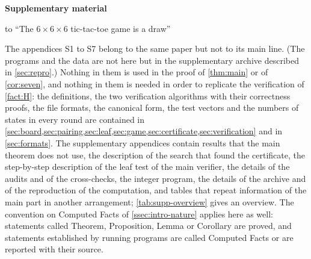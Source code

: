 \clearpage
\makeatletter
\setcounter{section}{0}
\renewcommand{\thesection}{S\arabic{section}}
\setcounter{table}{0}
\renewcommand{\thetable}{S\arabic{table}}
\makeatother
{}\label{part:supp}
\begin{center}
{\Large\bfseries Supplementary material}\par\smallskip
to ``The $6\times6\times6$ tic-tac-toe game is a draw''
\end{center}
\bigskip

\noindent
The appendices S1 to S7 belong to the same paper but not to its main line. (The programs and the data
are not here but in the supplementary archive described in \cref{sec:repro}.) Nothing in them is used in the
proof of \cref{thm:main} or of \cref{cor:seven}, and nothing in them is needed in order to replicate the
verification of \cref{fact:H}: the definitions, the two verification algorithms with their correctness
proofs, the file formats, the canonical form, the test vectors and the numbers of states in every round
are contained in \cref{sec:board,sec:pairing,sec:leaf,sec:game,sec:certificate,sec:verification} and in
\cref{sec:formats}. The supplementary appendices contain results that the main theorem does not use, the
description of the search that found the certificate, the step-by-step description of the leaf test of
the main verifier, the details of the audits and of the cross-checks, the integer program, the details of the archive and of the reproduction of the computation, and tables
that repeat information of the main part in another arrangement; \cref{tab:supp-overview} gives an
overview. The
convention on Computed Facts of \cref{ssec:intro-nature} applies here as well: statements called Theorem,
Proposition, Lemma or Corollary are proved, and statements established by running programs are called
Computed Facts or are reported with their source.


